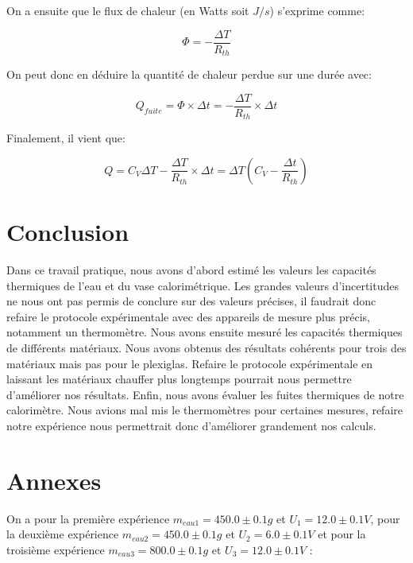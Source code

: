 \documentclass[12pt]{article}
\begin{document}
On a ensuite que le flux de chaleur (en Watts soit $J/s$) s'exprime comme:

\begin{equation}
	\Phi = - \frac{\Delta T}{R_{th}}
\end{equation}

On peut donc en déduire la quantité de chaleur perdue sur une durée avec:

\begin{equation}
	Q_{fuite} = \Phi \times \Delta t = - \frac{\Delta T}{R_{th}} \times \Delta t
\end{equation}

Finalement, il vient que:

\begin{equation}
	Q = C_V \Delta T - \frac{\Delta T}{R_{th}} \times \Delta t = \Delta T \left( C_V - \frac{\Delta t}{R_{th}} \right)
\end{equation}

\section{Conclusion}

Dans ce travail pratique, nous avons d'abord estimé les valeurs les capacités thermiques de l'eau et du vase calorimétrique. Les grandes valeurs d'incertitudes ne nous ont pas permis de conclure sur des valeurs précises, il faudrait donc refaire le protocole expérimentale avec des appareils de mesure plus précis, notamment un thermomètre. Nous avons ensuite mesuré les capacités thermiques de différents matériaux. Nous avons obtenus des résultats cohérents pour trois des matériaux mais pas pour le plexiglas. Refaire le protocole expérimentale en laissant les matériaux chauffer plus longtemps pourrait nous permettre d'améliorer nos résultats. Enfin, nous avons évaluer les fuites thermiques de notre calorimètre. Nous avions mal mis le thermomètres pour certaines mesures, refaire notre expérience nous permettrait donc d'améliorer grandement nos calculs. 

\newpage
\section*{Annexes}


On a pour la première expérience  $m_{eau1}=450.0\pm 0.1g$ et $U_1=12.0\pm 0.1V$, pour la deuxième expérience $m_{eau2}=450.0\pm 0.1g$ et $U_2=6.0\pm 0.1V$ et pour la troisième expérience  $m_{eau3}=800.0\pm 0.1g$ et $U_3=12.0\pm 0.1V$ :
\end{document}
